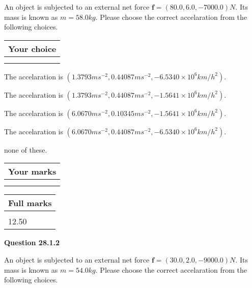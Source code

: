 \documentclass[12pt]{article}
\begin{document}
  
 
An object is subjected to an external net force $\mathbf{f}=(
80.0 ,
6.0,
-7000.0  )N$. Its mass is known as
$m= %
58.0  kg$. Please choose the correct accelaration
from the following choices.
 
  
  
\noindent\hspace{3.0in} \begin{tabular}{|l|}
\hline
Your choice \\
\hline
 \\ 
 \\ 
\hline
\end{tabular}
  
  
 
 
The accelaration is
$(
1.3793ms^{-2},
0.44087ms^{-2},
-6.5340 \times 10^{6}km/h^2
).
$
 
 
The accelaration is
$(
1.3793ms^{-2},
0.44087ms^{-2},
-1.5641 \times 10^{6}km/h^2
).
$
 
 
The accelaration is
$(
6.0670ms^{-2},
0.10345ms^{-2},
-1.5641 \times 10^{6}km/h^2
).
$
 
 
The accelaration is
$(
6.0670ms^{-2},
0.44087ms^{-2},
-6.5340 \times 10^{6}km/h^2
).
$
 
 
none of these.
 
 
 
 

 
\vspace{0.3in}
  
\vspace{0.2in}
  
         \begin{tabular}{|l|}
\hline
 Your marks  \\
\hline
 \\ 
 \\ 
\hline
\end{tabular}
\hspace{0.05in} \begin{tabular}{|l|}
\hline
 Full marks  \\
\hline
 \\ 
12.50 \\
\hline
\end{tabular}
{\textbf{\Large{Question
28.1.2 
}}}
  
  
 
An object is subjected to an external net force $\mathbf{f}=(
30.0 ,
2.0,
-9000.0  )N$. Its mass is known as
$m= %
54.0  kg$. Please choose the correct accelaration
from the following choices.
 
\end{document}
